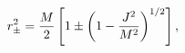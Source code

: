 \begin{equation}
r_\pm^2 = {M \over 2} \left[ 1 \pm \left( 1 - {J^2 \over M^2}
  \right)^{1/2} \right],
\end{equation}

